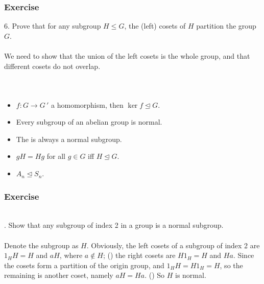 \documentclass{beamer}
\newcommand{\mysol}{\yellow{Solution:}\\}
\begin{document}
\begin{frame}
    \frametitle{Exercise}
    6. Prove that for any subgroup $H \leq G$, the
    (left) cosets of $H$ partition the group $G$.
    \\\vs{3em}
    \\
    \hh We need to show that the union of the left cosets is the whole group, and that
    different cosets do not overlap.
\end{frame}
\begin{frame}
    \frametitle{}
    \\\vs{1em}
    \begin{itemize}
        \item $f : G \to G\,'$ a homomorphism, then $\ker f \trianglelefteq G$.
        \item Every subgroup of an abelian group is normal.
        \item The  is always a normal subgroup.
        \item $gH=Hg$ for all $g\in G$ if\mbox{f} $H \trianglelefteq G $. 
        \item $A_n\trianglelefteq S_n$.
    \end{itemize}
\end{frame}
\begin{frame}
    \frametitle{Exercise}
    \\
    . Show that any subgroup of index 2 in a group
    is a normal subgroup.\\
    \vv\pause
    \mysol
    \hh Denote the subgroup as $H$. Obviously, the left cosets of a subgroup of index 2 are
    $1_H H= H$ and $aH$, where $a \not\in H$; () the right 
    cosets are $H 1_H=H$ and $Ha$. Since the cosets form a 
    partition of the origin group, and $1_H H = H 1_H =H $, so 
    the remaining is another coset, namely $aH=Ha$. () 
    So $H$ is normal.
    \\\vs{2em}
    \\
\end{frame}
\end{document}
